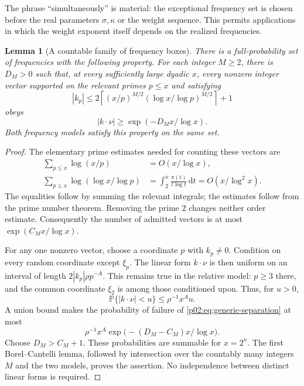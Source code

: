 \documentclass[11pt,letterpaper]{article}
\newtheorem{lemma}[theorem]{Lemma}
\theoremstyle{definition}
\theoremstyle{remark}
\newcommand{\1}{\mathbf 1}
\begin{document}
The phrase ``simultaneously'' is material: the exceptional frequency
set is chosen before the real parameters $\sigma,\kappa$ or the weight
sequence. This permits applications in which the weight exponent
itself depends on the realized frequencies.

\begin{lemma}[A countable family of frequency boxes]
\label{p02:lem:generic-small-divisors}
There is a full-probability set of frequencies with the following
property. For each integer $M\ge2$, there is $D_M>0$ such that, at
every sufficiently large dyadic $x$, every nonzero integer vector
supported on the relevant primes $p\le x$ and satisfying
\[
 |k_p|\le 2\left\lceil
 (x/p)^{M/2}(\log x/\log p)^{M/2}\right\rceil+1
\]
obeys
\begin{equation}\label{p02:eq:generic-separation}
 |k\cdot\nu|\ge\exp(-D_Mx/\log x).
\end{equation}
Both frequency models satisfy this property on the same set.
\end{lemma}
\begin{proof}
The elementary prime estimates needed for counting these vectors are
\begin{align}
 \sum_{p\le x}\log(x/p)&=O(x/\log x),\label{p02:eq:generic-logsum}\\
 \sum_{p\le x}\log(\log x/\log p)
 &=\int_2^x\frac{\pi(t)}{t\log t}\,\mathrm dt
 =O(x/\log^2x).\label{p02:eq:generic-loglogsum}
\end{align}
The equalities follow by summing the relevant integrals; the estimates
follow from the prime number theorem. Removing the prime $2$ changes
neither order estimate. Consequently the number of admitted vectors
is at most $\exp(C_Mx/\log x)$.

For any one nonzero vector, choose a coordinate $p$ with $k_p\ne0$.
Condition on every random coordinate except $\xi_p$. The linear form
$k\cdot\nu$ is then uniform on an interval of length
$2|k_p|\rho p^{-A}$. This remains true in the relative model:
$p\ge3$ there, and the common coordinate $\xi_2$ is among those
conditioned upon. Thus, for $u>0$,
\[
 \mathbb P\{|k\cdot\nu|<u\}
 \le\rho^{-1}x^Au.
\]
A union bound makes the probability of failure of
\eqref{p02:eq:generic-separation} at most
\[
 \rho^{-1}x^A\exp\bigl(-(D_M-C_M)x/\log x\bigr).
\]
Choose $D_M>C_M+1$. These probabilities are summable for $x=2^n$.
The first Borel--Cantelli lemma, followed by intersection over the
countably many integers $M$ and the two models, proves the assertion.
No independence between distinct linear forms is required.
\end{proof}
\end{document}
